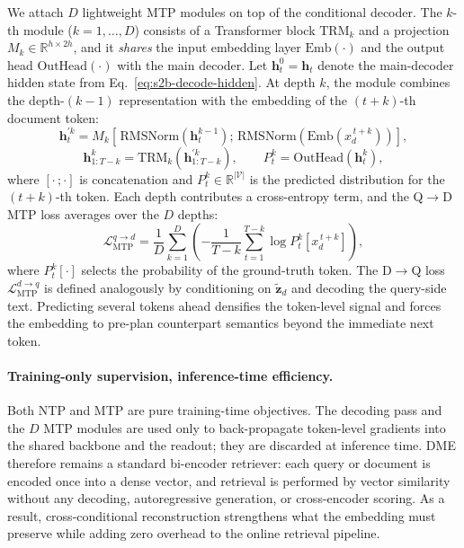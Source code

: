 We attach $D$ lightweight MTP modules on top of the conditional decoder. The $k$-th module ($k=1,\dots,D$) consists of a Transformer block $\mathrm{TRM}_k$ and a projection $M_k\in\mathbb{R}^{h\times 2h}$, and it \emph{shares} the input embedding layer $\mathrm{Emb}(\cdot)$ and the output head $\mathrm{OutHead}(\cdot)$ with the main decoder. Let $\mathbf{h}_t^{0}\!=\!\mathbf{h}_t$ denote the main-decoder hidden state from Eq.~\eqref{eq:s2b-decode-hidden}. At depth $k$, the module combines the depth-$(k\!-\!1)$ representation with the embedding of the $(t\!+\!k)$-th document token:
\begin{equation}
\mathbf{h}_t^{\prime k}
= M_k\!\left[\,\mathrm{RMSNorm}\!\left(\mathbf{h}_t^{k-1}\right);\,
\mathrm{RMSNorm}\!\left(\mathrm{Emb}(x_d^{\,t+k})\right)\right],
\label{eq:s2b-mtp-combine}
\end{equation}
\begin{equation}
\mathbf{h}_{1:T-k}^{k} = \mathrm{TRM}_k\!\left(\mathbf{h}_{1:T-k}^{\prime k}\right),
\qquad
P_{t}^{k}
= \mathrm{OutHead}\!\left(\mathbf{h}_t^{k}\right),
\label{eq:s2b-mtp-head}
\end{equation}
where $[\cdot\,;\cdot]$ is concatenation and $P_{t}^{k}\in\mathbb{R}^{|\mathcal{V}|}$ is the predicted distribution for the $(t\!+\!k)$-th token. Each depth contributes a cross-entropy term, and the Q$\rightarrow$D MTP loss averages over the $D$ depths:
\begin{equation}
\mathcal{L}_{\text{MTP}}^{q\rightarrow d}
= \frac{1}{D}\sum_{k=1}^{D}
\left(-\frac{1}{T-k}\sum_{t=1}^{T-k}
\log P_{t}^{k}\!\left[x_d^{\,t+k}\right]\right),
\label{eq:s2b-mtp-q2d}
\end{equation}
where $P_{t}^{k}[\cdot]$ selects the probability of the ground-truth token. The D$\rightarrow$Q loss $\mathcal{L}_{\text{MTP}}^{d\rightarrow q}$ is defined analogously by conditioning on $\tilde{\mathbf{z}}_d$ and decoding the query-side text. Predicting several tokens ahead densifies the token-level signal and forces the embedding to pre-plan counterpart semantics beyond the immediate next token.

\paragraph{Training-only supervision, inference-time efficiency.}
Both NTP and MTP are pure training-time objectives. The decoding pass and the $D$ MTP modules are used only to back-propagate token-level gradients into the shared backbone and the readout; they are discarded at inference time. DME therefore remains a standard bi-encoder retriever: each query or document is encoded once into a dense vector, and retrieval is performed by vector similarity without any decoding, autoregressive generation, or cross-encoder scoring. As a result, cross-conditional reconstruction strengthens what the embedding must preserve while adding zero overhead to the online retrieval pipeline.

